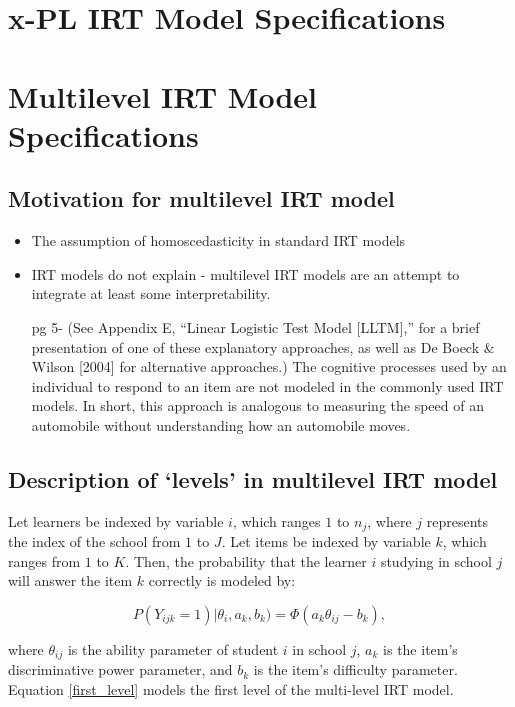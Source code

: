 \documentclass[12pt]{article}
\begin{document}
\section{x-PL IRT Model Specifications}

\section{Multilevel IRT Model Specifications}
\subsection{Motivation for multilevel IRT model}
\begin{itemize}
    \item The assumption of homoscedasticity in standard IRT models
    \item IRT models do not explain - multilevel IRT models are an attempt to integrate at least some interpretability.
    
    pg 5- (See Appendix E, “Linear Logistic Test Model [LLTM],” for a brief presentation of one of these explanatory approaches, as well as De Boeck \& Wilson [2004] for alternative approaches.) The cognitive processes used by an individual to respond to an item are not modeled in the commonly used IRT models. In short, this approach is analogous to measuring the speed of an automobile without understanding how an automobile moves. \cite{de2013theory}
\end{itemize}

\subsection{Description of `levels' in multilevel IRT model}

Let learners be indexed by variable $i$, which ranges $1$ to $n_j$, where $j$ represents the index of the school from $1$ to $J$. Let items be indexed by variable $k$, which ranges from $1$ to $K$. Then, the probability that the learner $i$ studying in school $j$ will answer the item $k$ correctly is modeled by:

\begin{equation}\label{first_level}
    P(Y_{ijk}=1) | \theta_i, a_k, b_k) = \Phi(a_k \theta_{ij} - b_k),
\end{equation}

where $\theta_{ij}$ is the ability parameter of student $i$ in school $j$, $a_k$ is the item's discriminative power parameter, and $b_k$ is the item's difficulty parameter. Equation \eqref{first_level} models the first level of the multi-level IRT model.
\end{document}
